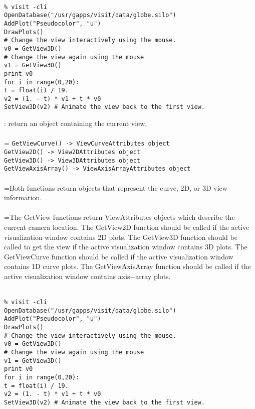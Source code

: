 \documentclass[10pt,a4paper]{report}
\begin{document}
\\[-6mm]
\begin{verbatim}% visit -cli
OpenDatabase("/usr/gapps/visit/data/globe.silo")
AddPlot("Pseudocolor", "u")
DrawPlots()
# Change the view interactively using the mouse.
v0 = GetView3D()
# Change the view again using the mouse
v1 = GetView3D()
print v0
for i in range(0,20):
t = float(i) / 19.
v2 = (1. - t) * v1 + t * v0
SetView3D(v2) # Animate the view back to the first view.
\end{verbatim}
\newpage


{}
: return an object containing the current view.\\[-3mm]

 \\ 
\hangindent=\parindent 
\verb!GetViewCurve() -> ViewCurveAttributes object!\\ 
\verb!GetView2D() -> View2DAttributes object!\\ 
\verb!GetView3D() -> View3DAttributes object!\\ 
\verb!GetViewAxisArray() -> ViewAxisArrayAttributes object!\\ [-3mm]

 \\ 
\hangindent=\parindent Both functions return objects that represent the curve, 2D, or 3D view information. \\[-3mm] 

 \\ 
\hangindent=\parindent The GetView functions return ViewAttributes objects which describe the current camera location. The GetView2D function should be called if the active visualization window contains 2D plots. The GetView3D function should be called to get the view if the active visualization window contains 3D plots. The GetViewCurve function should be called if the active visualization window contains 1D curve plots.  The GetViewAxisArray function should be called if the active visualization window contains axis$-$array plots. \\[-3mm] 

\\[-6mm]
\begin{verbatim}% visit -cli
OpenDatabase("/usr/gapps/visit/data/globe.silo")
AddPlot("Pseudocolor", "u")
DrawPlots()
# Change the view interactively using the mouse.
v0 = GetView3D()
# Change the view again using the mouse
v1 = GetView3D()
print v0
for i in range(0,20):
t = float(i) / 19.
v2 = (1. - t) * v1 + t * v0
SetView3D(v2) # Animate the view back to the first view.
\end{verbatim}
\newpage
\end{document}
